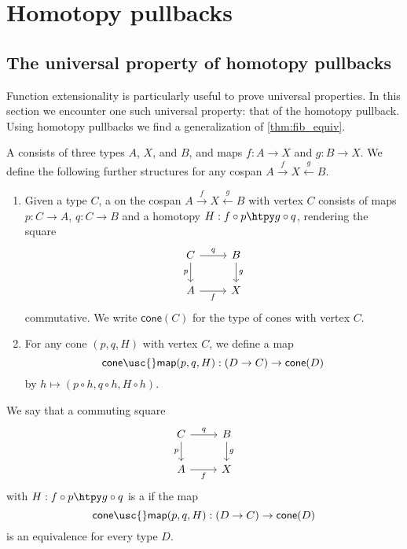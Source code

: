 \chapter{Homotopy pullbacks}

\section{The universal property of homotopy pullbacks}

Function extensionality is particularly useful to prove universal properties. In this section we encounter one such universal property: that of the homotopy pullback. Using homotopy pullbacks we find a generalization of \autoref{thm:fib_equiv}.

\begin{defn}
A  consists of three types $A$, $X$, and $B$, and maps $f:A\to X$ and $g:B\to X$. We define the following further structures for any cospan $A \stackrel{f}{\rightarrow} X \stackrel{g}{\leftarrow} B$.
\begin{enumerate}
\item Given a type $C$, a  on the cospan $A \stackrel{f}{\rightarrow} X \stackrel{g}{\leftarrow} B$ with vertex $C$ consists of maps $p:C\to A$, $q:C\to B$ and a homotopy $H:f\circ p\htpy g\circ q$, rendering the square
\begin{equation*}
\begin{tikzcd}
C \arrow[r,"q"] \arrow[d,swap,"p"] & B \arrow[d,"g"] \\
A \arrow[r,swap,"f"] & X
\end{tikzcd}
\end{equation*}
commutative. We write $\mathsf{cone}(C)$ for the type of cones with vertex $C$. 
\item For any cone $(p,q,H)$ with vertex $C$, we define a map
\begin{equation*}
\mathsf{cone\usc{}map}(p,q,H):(D\to C)\to\mathsf{cone}(D)
\end{equation*}
by $h\mapsto (p\circ h,q\circ h,H\circ h)$. 
\end{enumerate}
\end{defn}

\begin{defn}
We say that a commuting square
\begin{equation*}
\begin{tikzcd}
C \arrow[r,"q"] \arrow[d,swap,"p"] & B \arrow[d,"g"] \\
A \arrow[r,swap,"f"] & X
\end{tikzcd}
\end{equation*}
with $H:f\circ p\htpy g\circ q$ is a  if the map
\begin{equation*}
\mathsf{cone\usc{}map}(p,q,H):(D\to C)\to\mathsf{cone}(D)
\end{equation*}
is an equivalence for every type $D$. 
\end{defn}

